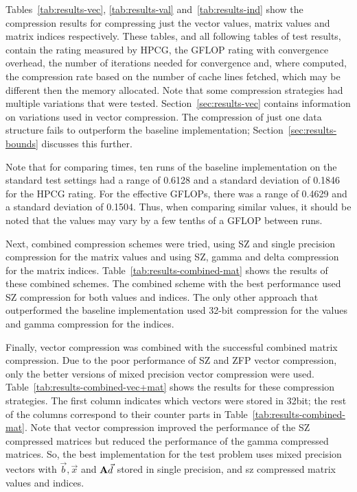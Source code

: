 Tables~\ref{tab:results-vec}, \ref{tab:results-val} and~\ref{tab:results-ind} show the compression results for compressing just the vector values, matrix values and matrix indices respectively.
These tables, and all following tables of test results, contain the rating measured by HPCG, the GFLOP rating with convergence overhead, the number of iterations needed for convergence and, where computed, the compression rate based on the number of cache lines fetched, which may be different then the memory allocated.
Note that some compression strategies had multiple variations that were tested.
Section~\ref{sec:results-vec} contains information on variations used in vector compression.
The compression of just one data structure fails to outperform the baseline implementation; Section~\ref{sec:results-bounds} discusses this further.

Note that for comparing times, ten runs of the baseline implementation on the standard test settings had a range of 0.6128 and a standard deviation of 0.1846 for the HPCG rating.
For the effective GFLOPs, there was a range of 0.4629 and a standard deviation of 0.1504.
Thus, when comparing similar values, it should be noted that the values may vary by a few tenths of a GFLOP between runs.






Next, combined compression schemes were tried, using SZ and single precision compression for the matrix values and using SZ, gamma and delta compression for the matrix indices.
Table~\ref{tab:results-combined-mat} shows the results of these combined schemes.
The combined scheme with the best performance used SZ compression for both values and indices.
The only other approach that outperformed the baseline implementation used 32-bit compression for the values and gamma compression for the indices.



Finally, vector compression was combined with the successful combined matrix compression.
Due to the poor performance of SZ and ZFP vector compression, only the better versions of mixed precision vector compression were used.
Table~\ref{tab:results-combined-vec+mat} shows the results for these compression strategies.
The first column indicates which vectors were stored in 32bit; the rest of the columns correspond to their counter parts in Table~\ref{tab:results-combined-mat}.
Note that vector compression improved the performance of the SZ compressed matrices but reduced the performance of the gamma compressed matrices.
So, the best implementation for the test problem uses mixed precision vectors with \(\vec{b}, \vec{x}\) and \(\mathbf{A}\vec{d}\) stored in single precision, and sz compressed matrix values and indices.

